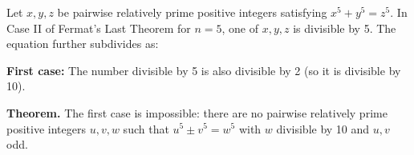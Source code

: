 Let $x, y, z$ be pairwise relatively prime positive integers satisfying $x^5 + y^5 = z^5$. In Case II of Fermat's Last Theorem for $n = 5$, one of $x, y, z$ is divisible by 5. The equation further subdivides as:

\textbf{First case:} The number divisible by 5 is also divisible by 2 (so it is divisible by 10).

\textbf{Theorem.} The first case is impossible: there are no pairwise relatively prime positive integers $u, v, w$ such that $u^5 \pm v^5 = w^5$ with $w$ divisible by 10 and $u, v$ odd.
